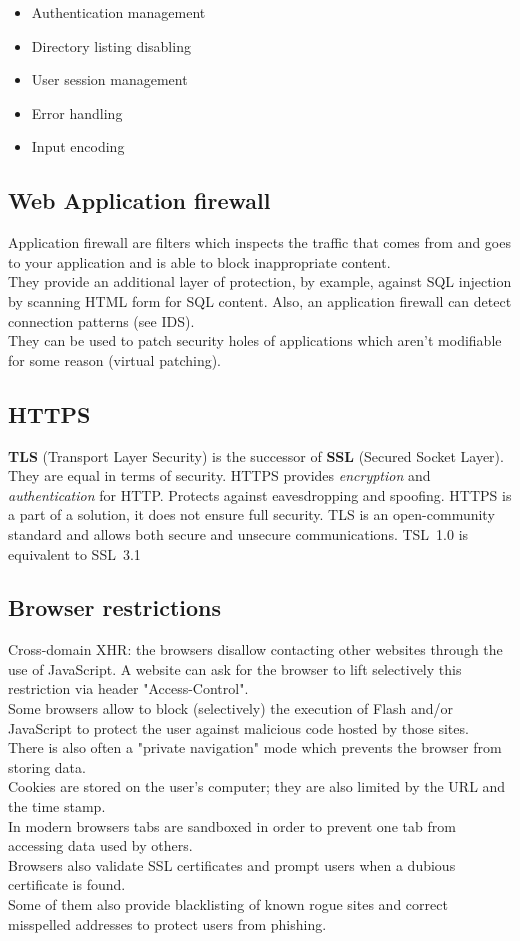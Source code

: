 \begin{itemize}
\item Authentication management
\item Directory listing disabling
\item User session management
\item Error handling
\item Input encoding
\end{itemize}

\subsection{Web Application firewall}
Application firewall are filters which inspects the traffic that comes
from and goes to your application and is able to block inappropriate
content.\\
They provide an additional layer of protection, by example, against
SQL injection by scanning HTML form for SQL content.
Also, an application firewall can detect connection patterns (see IDS).
\\
They can be used to patch security holes of applications which aren't modifiable for some reason (virtual patching).

\subsection{HTTPS}
\textbf{TLS} (Transport Layer Security) is the successor of \textbf{SSL}
(Secured Socket Layer).
They are equal in terms of security.
HTTPS provides \emph{encryption} and \emph{authentication} for HTTP.
\newline Protects against eavesdropping and spoofing.
HTTPS is a part of a solution, it does not ensure full security.
TLS is an open-community standard and allows both secure and unsecure
communications.
\newline TSL~1.0 is equivalent to SSL~3.1

\subsection{Browser restrictions}
Cross-domain XHR: the browsers disallow contacting other websites
through the use of JavaScript. A website can ask for the browser to
lift selectively this restriction via header "Access-Control".\\
Some browsers allow to block (selectively) the execution of Flash and/or
JavaScript to protect the user against malicious code hosted by those sites.
\\
There is also often a "private navigation" mode which prevents the
browser from storing data.\\
Cookies are stored on the user's computer; they are also limited by the URL
and the time stamp.\\
In modern browsers tabs are sandboxed in order to prevent one tab from
accessing data used by others.
\\
Browsers also validate SSL certificates and prompt users when a
dubious certificate is found.\\
Some of them also provide blacklisting of known rogue sites and
correct misspelled addresses to protect users from phishing.

